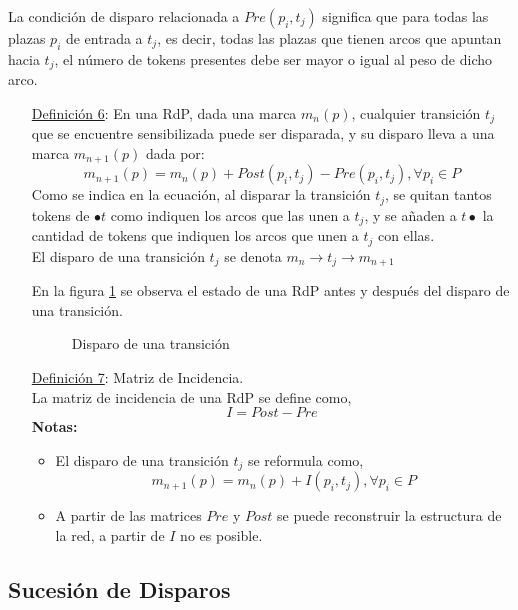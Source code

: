 La condición de disparo relacionada a $Pre(p_{i}, t_{j})$ significa que para
todas las plazas $p_{i}$ de entrada a $t_{j}$, es decir, todas las plazas que
tienen arcos que apuntan hacia $t_{j}$, el número de tokens presentes debe ser
mayor o igual al peso de dicho arco.

\begin{itemize}
  \item [\underline{Definición 6}:] En una RdP, dada una marca $ m_{n}(p) $,
  cualquier transición $ t_{j} $ que se encuentre sensibilizada puede ser
  disparada, y su disparo lleva a una marca $ m_{n+1}(p)$ dada por:
  $$ m_{n+1}(p) = m_{n}(p) + Post(p_{i}, t_{j}) - Pre(p_{i}, t_{j}), \forall
  p_{i} \in P $$
  Como se indica en la ecuación, al disparar la transición $ t_{j} $, se quitan
  tantos tokens de $ \bullet t $ como indiquen los arcos que las unen a $ t_{j}
  $, y se añaden a $ t \bullet $ la cantidad de tokens que indiquen los arcos
  que unen a $ t_{j} $ con ellas.\\
  El disparo de una transición $ t_{j} $ se denota $ m_{n}\rightarrow t_{j}
  \rightarrow m_{n+1} $

  En la figura {\ref{fig:disparo_transicion}} se observa el estado de una RdP
  antes y después del disparo de una transición.
  \begin{figure}[h]
    \centering
    \caption{Disparo de una transición}
    \label{fig:disparo_transicion}
  \end{figure}
  
  \item  [\underline{Definición 7}:] Matriz de Incidencia.\\
  La matriz de incidencia de una RdP se define como,
  $$ I = Post - Pre $$
  \textbf{Notas:}
  \begin{itemize}
    \item El disparo de una transición $t_{j}$ se reformula como, $$ m_{n+1}(p)
    = m_{n}(p) + I(p_{i}, t_{j}), \forall p_{i} \in P $$
    \item A partir de las matrices $Pre$ y $Post$ se puede reconstruir la
    estructura de la red, a partir de $I$ no es posible.
  \end{itemize}
\end{itemize}

\subsection{Sucesión de Disparos}

